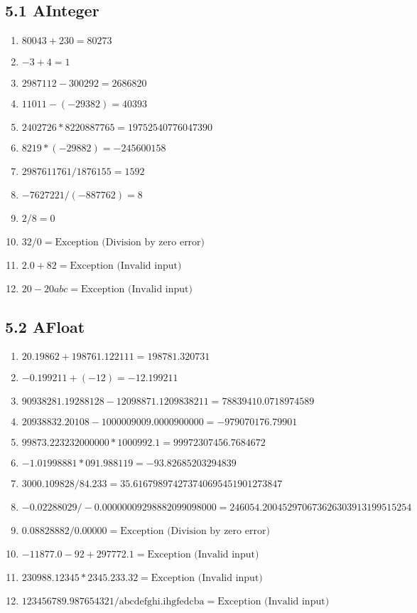\documentclass[12pt]{article}
\begin{document}
\subsection*{5.1 AInteger}
\begin{enumerate}
    \item \(80043 + 230 = 80273\)
    \item \(-3 + 4 = 1\)
    \item \(2987112 - 300292 = 2686820\)
    \item \(11011 - (-29382) = 40393\)
    \item \(2402726 * 8220887765 = 19752540776047390\)
    \item \(8219 * (-29882) = -245600158\)
    \item \(2987611761 / 1876155 = 1592\)
    \item \(-7627221 / (-887762) = 8\)
    \item \(2 / 8 = 0\)
    \item \(32 / 0 = \text{Exception (Division by zero error)}\)
    \item \(2.0 + 82 = \text{Exception (Invalid input)}\)
    \item \(20 - 20abc = \text{Exception (Invalid input)}\)
\end{enumerate}

\subsection*{5.2 AFloat}
\begin{enumerate}
    \item \(20.19862 + 198761.122111 = 198781.320731\)
    \item \(-0.199211 + (-12) = -12.199211\)
    \item \(90938281.19288128 - 12098871.1209838211 = 78839410.0718974589\)
    \item \(20938832.20108 - 1000009009.0000900000 = -979070176.79901\)
    \item \(99873.223232000000 * 1000992.1 = 99972307456.7684672\)
    \item \(-1.01998881 * 091.988119 = -93.82685203294839\)
    \item \(3000.109828 / 84.233 = 35.616798974273740695451901273847\)
    \item \(-0.02288029 / -0.00000009298882099098000 = 246054.200452970673626303913199515254\)
    \item \(0.08828882 / 0.00000 = \text{Exception (Division by zero error)}\)
    \item \(-11877.0-92 + 297772.1 = \text{Exception (Invalid input)}\)
    \item \(230988.12345 * 2345.233.32 = \text{Exception (Invalid input)}\)
    \item \(123456789.987654321 / \text{abcdefghi.ihgfedcba} = \text{Exception (Invalid input)}\)
\end{enumerate}
\end{document}
